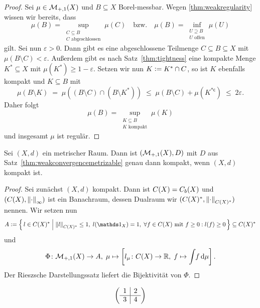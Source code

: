 \documentclass[../main/main.tex]{subfiles}
\begin{document}
	\begin{proof}
		Sei $\mu \in \mathcal{M}_{+,1}(X)$ und $B \subseteq X$ Borel-messbar. 
		Wegen \ref{thm:weakregularity} wissen wir bereits, dass 
		\[\mu(B) = \sup_{\substack{C \subseteq B \\ C \text{ abgeschlossen}}} \mu(C) 
			\quad \text{bzw.} \quad \mu(B) = \inf_{\substack{U \supseteq B \\ U \text{ offen}}} 
			\mu(U)\]
		gilt. Sei nun $\varepsilon > 0$. Dann gibt es eine abgeschlossene Teilmenge 
		$C \subseteq B \subseteq X$ mit $\mu(B \setminus C) < \varepsilon$. 
		Außerdem gibt es nach Satz~\ref{thm:tightness} eine kompakte Menge 
		$K^\ast \subseteq X$ mit $\mu(K^\ast) \geq 1 - \varepsilon$. Setzen 
		wir nun $K \vcentcolon = K^\ast \cap C$, so ist $K$ ebenfalls kompakt und 
		$K \subseteq B$ mit 
		\[ \mu(B \setminus K) 
			\; = \; \mu((B \setminus C) \cap (B \setminus K^\ast)) 
			\; \leq \; \mu(B \setminus C) + \mu(K^{\ast \mathsf{c}}) 
			\; \leq \; 2 \varepsilon \text{.} \]
		Daher folgt 
		\[\mu(B) 
			= \sup_{\substack{K \subseteq B \\ K \text{ kompakt}}} \mu(K)\] 
		und insgesamt $\mu$ ist regulär.
	\end{proof}

	\begin{Hilfssatz}
		Sei $(X, d)$ ein metrischer Raum. Dann ist $(\mathcal{M}_{+,1}(X), D)$ 
		mit $D$ aus Satz~\ref{thm:weakconvergencemetrizable} genau dann kompakt, 
		wenn $(X, d)$ kompakt ist.
	\end{Hilfssatz}

	\begin{proof}
		Sei zunächst $(X, d)$ kompakt. Dann ist $C(X) = C_b(X)$ und $(C(X), \left\lVert\cdot\right\rVert_\infty)$ ist ein Banachraum, dessen Dualraum wir 
		$(C(X)^\ast, \left\lVert\cdot\right\rVert_{C(X)^{\ast}})$ nennen.
		Wir setzen nun
		\[ A \defby \setcomp{l \in C(X)^\ast}{\norm{l}_{C(X)^\ast} \leq 1, \; l(\indfct_{X}) = 1, \; \forall f \in C(X) \text{ mit } f \geq 0 : l(f) \geq 0} \subseteq C(X)^\ast \]
		und
		\[ \Phi \colon \mathcal{M}_{+,1}(X) \to A, \; \mu \mapsto \left[l_\mu \colon C(X) \to \mathbb{R}, \; f \mapsto \int_{} \, f \, \mathrm{d}\mu \right]  \text{.} \]
		Der Rieszsche Darstellungssatz liefert die Bijektivität von $\Phi$.
	\end{proof}

	\[ \left( \begin{array}{c | c}
		1 & 2 \\
		\hline
		3 & 4
	\end{array} \right) \]
	
	
\end{document}
